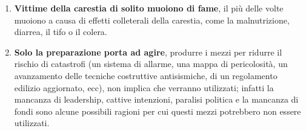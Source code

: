 \begin{enumerate}
\item\textbf{Vittime della carestia di solito muoiono di fame}, il più delle volte muoiono a causa di effetti colleterali della carestia, come la malnutrizione, diarrea, il tifo o il colera.
\item\textbf{Solo la preparazione porta ad agire}, produrre i mezzi per ridurre il rischio di catastrofi (un sistema di allarme, una mappa di pericolosità, un avanzamento delle tecniche costruttive antisismiche, di un regolamento edilizio aggiornato, ecc), non implica che verranno utilizzati; infatti la mancanza di leadership, cattive intenzioni, paralisi politica e la mancanza di fondi sono alcune possibili ragioni per cui questi mezzi potrebbero non essere utilizzati.

\end{enumerate}
\newpage

